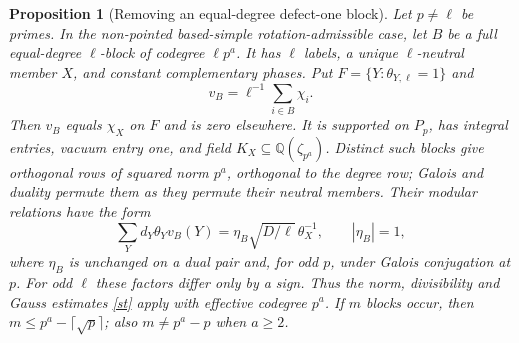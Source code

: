 \documentclass[11pt]{amsart}
\numberwithin{equation}{section}
\newtheorem{proposition}[theorem]{Proposition}
\theoremstyle{definition}
\theoremstyle{plain}
\newcommand{\QQ}{\mathbb Q}
\begin{document}
\begin{proposition}[Removing an equal-degree defect-one block]\label{new:effective}
Let $p\ne\ell$ be primes. In the non-pointed based-simple
rotation-admissible case,
let $B$ be a full equal-degree $\ell$-block of codegree $\ell p^a$.
It has $\ell$ labels, a unique $\ell$-neutral member $X$, and constant
complementary phases. Put $F=\{Y:\theta_{Y,\ell}=1\}$ and
\[
 v_B=\ell^{-1}\sum_{i\in B}\chi_i .
\]
Then $v_B$ equals $\chi_X$ on $F$ and is zero elsewhere. It is
supported on $P_p$, has integral entries, vacuum entry one, and
field $K_X\subseteq\QQ(\zeta_{p^a})$. Distinct such blocks give
orthogonal rows of squared norm $p^a$, orthogonal to the degree row;
Galois and duality permute them as they permute their neutral members.
Their modular relations have the form
\begin{equation}\label{eq:effective-gauss}
 \sum_Yd_Y\theta_Yv_B(Y)
   =\eta_B\sqrt{D/\ell}\,\theta_X^{-1},\qquad |\eta_B|=1,
\end{equation}
where $\eta_B$ is unchanged on a dual pair and, for odd $p$,
under Galois conjugation at $p$. For odd $\ell$ these factors
differ only by a sign. Thus the norm, divisibility and Gauss estimates
\eqref{st} apply with effective codegree $p^a$.
If $m$ blocks occur, then $m\le p^a-\lceil\sqrt p\rceil$;
also $m\ne p^a-p$ when $a\ge2$.
\end{proposition}
\end{document}
